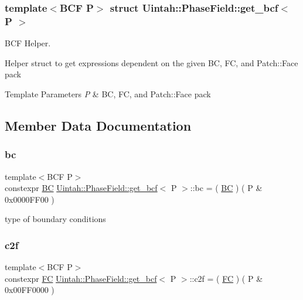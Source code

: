 \subsubsection*{template$<$B\+CF P$>$\newline
struct Uintah\+::\+Phase\+Field\+::get\+\_\+bcf$<$ P $>$}

B\+CF Helper. 

Helper struct to get expressions dependent on the given BC, FC, and Patch\+::\+Face pack


\begin{DoxyTemplParams}{Template Parameters}
{\em P} & BC, FC, and Patch\+::\+Face pack \\
\hline
\end{DoxyTemplParams}


\subsection{Member Data Documentation}
\mbox{\label{structUintah_1_1PhaseField_1_1get__bcf_ab31404d547e11f080ff3a88cf1a8d58d}} 
\subsubsection{\texorpdfstring{bc}{bc}}
{\footnotesize\ttfamily template$<$B\+CF P$>$ \\
constexpr \hyperlink{namespaceUintah_1_1PhaseField_a148fba372aa3be96fd6eede7a2fa10b5}{BC} \hyperlink{structUintah_1_1PhaseField_1_1get__bcf}{Uintah\+::\+Phase\+Field\+::get\+\_\+bcf}$<$ P $>$\+::bc = ( \hyperlink{namespaceUintah_1_1PhaseField_a148fba372aa3be96fd6eede7a2fa10b5}{BC} ) ( P \& 0x0000\+F\+F00 )\hspace{0.3cm}{\ttfamily [static]}}



type of boundary conditions 

\mbox{\label{structUintah_1_1PhaseField_1_1get__bcf_a1e4dad009db8a43648ddfb7bec0accb9}} 
\subsubsection{\texorpdfstring{c2f}{c2f}}
{\footnotesize\ttfamily template$<$B\+CF P$>$ \\
constexpr \hyperlink{namespaceUintah_1_1PhaseField_aeb51fe956fe07f1487f5878f4039f27c}{FC} \hyperlink{structUintah_1_1PhaseField_1_1get__bcf}{Uintah\+::\+Phase\+Field\+::get\+\_\+bcf}$<$ P $>$\+::c2f = ( \hyperlink{namespaceUintah_1_1PhaseField_aeb51fe956fe07f1487f5878f4039f27c}{FC} ) ( P \& 0x00\+F\+F0000 )\hspace{0.3cm}{\ttfamily [static]}}




